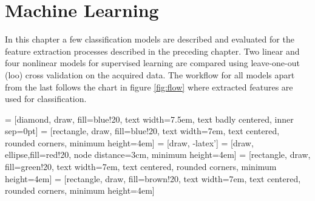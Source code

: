 \chapter{Machine Learning}

In this chapter a few classification models are described and evaluated for the feature extraction processes described in the preceding chapter. Two linear and four nonlinear models for supervised learning are compared using leave-one-out (\gls{loo}) cross validation on the acquired data. The workflow for all models apart from the last follows the chart in figure \ref{fig:flow} where extracted features are used for classification.

 = [diamond, draw, fill=blue!20, 
    text width=7.5em, text badly centered, inner sep=0pt]
 = [rectangle, draw, fill=blue!20, 
    text width=7em, text centered, rounded corners, minimum height=4em]
 = [draw, -latex']
 = [draw, ellipse,fill=red!20, node distance=3cm,
    minimum height=4em]
 = [rectangle, draw, fill=green!20, 
    text width=7em, text centered, rounded corners, minimum height=4em]
 = [rectangle, draw, fill=brown!20, 
    text width=7em, text centered, rounded corners, minimum height=4em]

